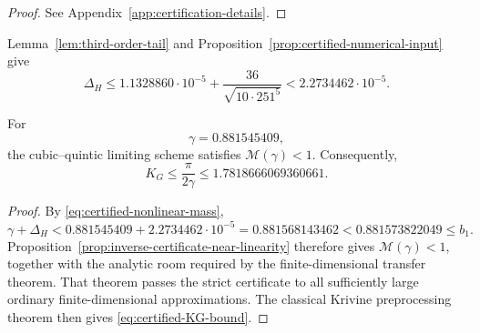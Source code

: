 \begin{proof}
See Appendix~\ref{app:certification-details}.
\end{proof}

Lemma~\ref{lem:third-order-tail} and
Proposition~\ref{prop:certified-numerical-input} give
\begin{equation}
  \Delta_H
  \le
  1.1328860\cdot10^{-5}
  +\frac{36}{\sqrt{10\cdot251^5}}
  <2.2734462\cdot10^{-5}.
  \label{eq:certified-nonlinear-mass}
\end{equation}

\begin{theorem}
\label{thm:cubic-quintic-upper-bound-certified}
For
\[
  \gamma=0.881545409,
\]
the cubic--quintic limiting scheme satisfies $\mathcal M(\gamma)<1$.
Consequently,
\begin{equation}
  K_G\le\frac{\pi}{2\gamma}
  \le1.7818666069360661.
  \label{eq:certified-KG-bound}
\end{equation}
\end{theorem}

\begin{proof}
By \eqref{eq:certified-nonlinear-mass},
\[
  \gamma+\Delta_H
  <0.881545409+2.2734462\cdot10^{-5}
  =0.881568143462
  <0.881573822049
  \le b_1.
\]
Proposition~\ref{prop:inverse-certificate-near-linearity} therefore gives
$\mathcal M(\gamma)<1$, together with the analytic room required by the
finite-dimensional transfer theorem.  That theorem passes the strict
certificate to all sufficiently large ordinary finite-dimensional
approximations.  The classical Krivine preprocessing theorem then gives
\eqref{eq:certified-KG-bound}.
\end{proof}
